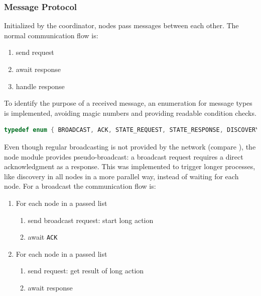 \subsubsection{Message Protocol} \label{Message Protocol}

Initialized by the coordinator, nodes pass messages between each other.
The normal communication flow is:
\begin{enumerate}
	\item send request
	\item await response
	\item handle response
\end{enumerate}

To identify the purpose of a received message, an enumeration for message types is implemented, avoiding magic numbers and providing readable condition checks.

\begin{lstlisting}[language=C, caption={Message type enumeration}, label={Message type enumeration}, float, floatplacement=H]
typedef enum { BROADCAST, ACK, STATE_REQUEST, STATE_RESPONSE, DISCOVERY_START_REQUEST, ... COMPUTATION_RESULT_RESPONSE } type_message;
\end{lstlisting}

Even though regular broadcasting is not provided by the network (compare ), the node module provides pseudo-broadcast: a broadcast request requires a direct acknowledgment as a response. This was implemented to trigger longer processes, like discovery in all nodes in a more parallel way, instead of waiting for each node. 
For a broadcast the communication flow is:

\begin{enumerate}
	\item For each node in a passed list
	\begin{enumerate}
		\item send broadcast request: start long action
		\item await \lstinline|ACK|
	\end{enumerate}
	\item For each node in a passed list
		\begin{enumerate}
		\item send request: get result of long action
		\item await response
	\end{enumerate}
\end{enumerate}


